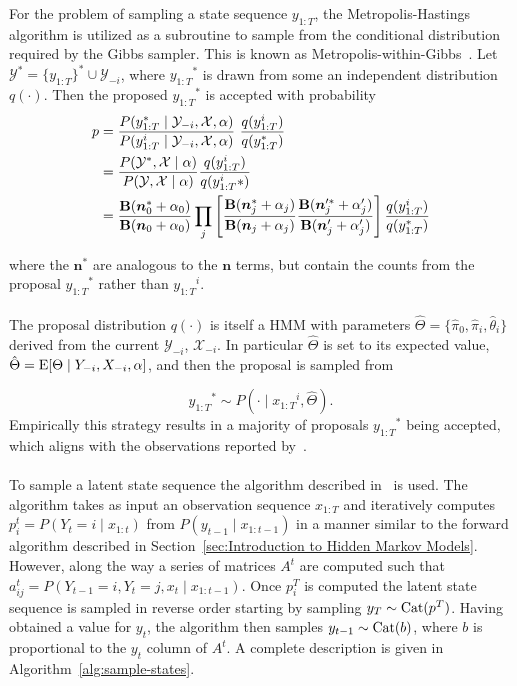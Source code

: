 \documentclass[12pt]{report}
\newcommand{\p}[0]{\prime}
\newcommand{\E}[0]{\text{\textnormal{E}}}
\newcommand{\1}[0]{\mathbbm{1}}
\newcommand{\Cat}[0]{\textnormal{Cat}}
\newcommand{\Bf}[0]{\text{\textbf{B}}}
\newcommand{\seq}[3]{\ensuremath{#1_{{#2}:{#3}}}}
\begin{document}
For the problem of sampling a state sequence $\seq{y}{1}{T}$, the Metropolis-Hastings algorithm
is utilized as a subroutine to sample from the conditional distribution required
by the Gibbs sampler. This is known as Metropolis-within-Gibbs~\cite{mh-within-gibbs}.
Let $\mathcal{Y}^* = \{\seq{y}{1}{T}\}^* \cup \mathcal{Y}_{-i}$,
where $\seq{y}{1}{T}^*$ is drawn from some an independent distribution $q(\cdot)$.
Then the proposed $\seq{y}{1}{T}^*$ is accepted with probability
\begin{align}
    p
    &= \frac{P(\seq{y}{1}{T}^* \mid \mathcal{Y}_{-i}, \mathcal{X}, \alpha)}
            {P(\seq{y}{1}{T}^i \mid \mathcal{Y}_{-i}, \mathcal{X}, \alpha)} \
            \frac{q(\seq{y}{1}{T}^i)}{q(\seq{y}{1}{T}^*)} \nonumber \\
    &= \frac{P(\mathcal{Y}^*, \mathcal{X} \mid \alpha)}
            {P(\mathcal{Y}, \mathcal{X} \mid \alpha)}
            \frac{q(\seq{y}{1}{T}^i)}{q(\seq{y}{1}{T}^i*)} \nonumber \\
    &= \frac{\Bf(\bm{n}_0^* + \alpha_0)}
            {\Bf(\bm{n}_0 + \alpha_0)}
    \prod_j \left[ \frac{\Bf(\bm{n}_j^* + \alpha_j)}
                        {\Bf(\bm{n}_j + \alpha_j)}
                   \frac{\Bf(\bm{n}_j^{\prime *} + \alpha_j^\p)}
                        {\Bf(\bm{n}_j^\p + \alpha_j^\p)}\right]
                   \frac{q(\seq{y}{1}{T}^i)}{q(\seq{y}{1}{T}^*)} \label{eq:mh-hmm-prob-accept}
\end{align}

where the $\bm{n}^*$ are analogous to the $\bm{n}$ terms, but contain the
counts from the proposal $\seq{y}{1}{T}^*$ rather than $\seq{y}{1}{T}^i$.
\\\\
The proposal distribution $q(\cdot)$ is itself a \ac{HMM} with parameters
$\hat{\Theta} = \{\hat{\pi}_0, \hat{\pi}_i, \hat{\theta}_i\}$ derived from the current
$\mathcal{Y}_{-i}$, $\mathcal{X}_{-i}$. In particular $\hat{\Theta}$ is set to its expected value,
$\hat{\Theta} = \E[\Theta \mid Y_{-i}, X_{-i}, \alpha]$, and then the proposal is sampled from

\[
    \seq{y}{1}{T}^* \sim P(\cdot \mid \seq{x}{1}{T}^i, \hat{\Theta}).
\]
Empirically this strategy results in a majority of proposals $\seq{y}{1}{T}^*$ being accepted,
which aligns with the observations reported by~\cite{hmm-comparison-johnson}.
\\\\
To sample a latent state sequence the algorithm described in~\cite{scott-bayesian-hmm} is used.
The algorithm takes as input an observation sequence $\seq{x}{1}{T}$ and iteratively computes
$p_i^t = P(Y_t=i \mid \seq{x}{1}{t})$ from $P(y_{t-1} \mid \seq{x}{1}{t-1})$ in
a manner similar to the forward algorithm described in Section~\ref{sec:Introduction to Hidden Markov Models}.
However, along the way a series of matrices $A^t$ are computed such that
$a_{ij}^t = P(Y_{t-1}=i, Y_{t}=j, x_t \mid \seq{x}{1}{t-1})$. Once $p_i^T$
is computed the latent state sequence is sampled in reverse order starting by
sampling $y_T \sim \Cat(p^T)$. Having obtained a value for $y_t$, the algorithm
then samples $y_{t-1} \sim \Cat(b)$, where $b$ is proportional to the $y_t$ column
of $A^t$. A complete description is given in Algorithm~\ref{alg:sample-states}.
\end{document}
